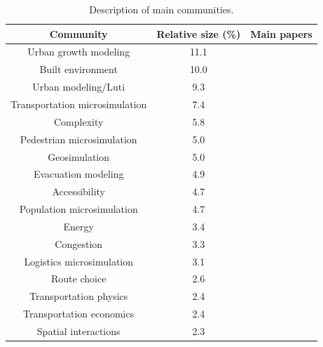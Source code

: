 \begin{table}[h!]
\caption{Description of main communities.\label{tab:communities}}
      \begin{tabular}{|ccc|}
        \hline
        Community & Relative size (\%)  & Main papers   \\ \hline
        Urban growth modeling & 11.1 & \cite{cheng2003urban} \cite{johnson2001environmental} \\
        Built environment & 10.0 & \cite{ewing2010travel}  \\
        Urban modeling/Luti & 9.3 & \cite{wegener2004overview} \cite{batty1976urban} \\
        Transportation microsimulation & 7.4 & \cite{smith1995transims} \\
        Complexity & 5.8 & \cite{batty2013new} \\
        Pedestrian microsimulation & 5.0 & \cite{blue2001cellular} \\
        Geosimulation & 5.0 & \cite{crooks2008key} \\
        Evacuation modeling & 4.9 & \cite{cova2003network} \\
        Accessibility & 4.7 & \cite{rodrigue2016geography} \\
        Population microsimulation & 4.7 & \cite{beckman1996creating} \\
        Energy & 3.4 & \cite{keirstead2012review} \\
        Congestion & 3.3 & \cite{gomes2004congested} \\
        Logistics microsimulation & 3.1 & \cite{hunt2007tour} \\
        Route choice & 2.6 & \cite{ramming2001network} \\
        Transportation physics & 2.4 & \cite{chowdhury2000statistical} \\
        Transportation economics & 2.4 & \cite{small2007economics} \\
        Spatial interactions & 2.3 & \cite{fotheringham1983new} \\\hline
      \end{tabular}
\end{table}



